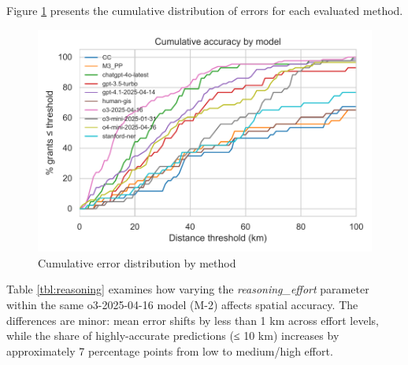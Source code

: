Figure \ref{fig:cdf_models} presents the cumulative distribution of
errors for each evaluated method.

\begin{figure}
\centering
\includegraphics[width=\textwidth,height=0.8\textheight,keepaspectratio]{figures/cdf_graphs/cdf_models_combined.pdf}
\caption{Cumulative error distribution by method}\label{fig:cdf_models}
\end{figure}

Table \ref{tbl:reasoning} examines how varying the
\emph{reasoning\_effort} parameter within the same o3-2025-04-16 model
(M-2) affects spatial accuracy. The differences are minor: mean error
shifts by less than 1 km across effort levels, while the share of
highly-accurate predictions (≤ 10 km) increases by approximately 7
percentage points from low to medium/high effort.

